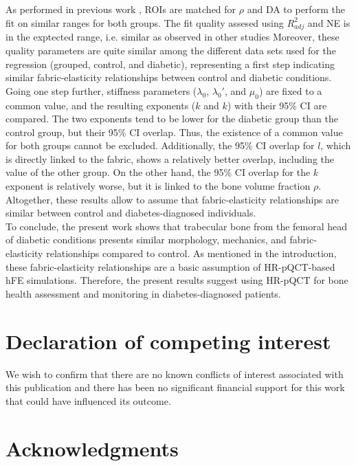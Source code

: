 \documentclass[a4paper,fleqn]{DC_ArtStyle}
\begin{document}
	As performed in previous work \cite{Simon2022}, ROIs are matched for $\rho$ and DA to perform the fit on similar ranges for both groups.
	The fit quality assesed using $R_{adj}^{2}$ and NE is in the exptected range, i.e. similar as observed in other studies \cite{Gross2012, Panyasantisuk2015, Simon2022}
	Moreover, these quality parameters are quite similar among the different data sets used for the regression (grouped, control, and diabetic), representing a first step indicating similar fabric-elasticity relationships between control and diabetic conditions.
	Going one step further, stiffness parameters ($\lambda_0$, $\lambda_0'$, and $\mu_0$) are fixed to a common value, and the resulting exponents ($k$ and $k$) with their 95\% CI are compared.
	The two exponents tend to be lower for the diabetic group than the control group, but their 95\% CI overlap. Thus, the existence of a common value for both groups cannot be excluded.
	Additionally, the 95\% CI overlap for $l$, which is directly linked to the fabric, shows a relatively better overlap, including the value of the other group.
	On the other hand, the 95\% CI overlap for the $k$ exponent is relatively worse, but it is linked to the bone volume fraction $\rho$.
	Altogether, these results allow to assume that fabric-elasticity relationships are similar between control and diabetes-diagnosed individuals.
	\\[0.5em]
	To conclude, the present work shows that trabecular bone from the femoral head of diabetic conditions presents similar morphology, mechanics, and fabric-elasticity relationships compared to control.
	As mentioned in the introduction, these fabric-elasticity relationships are a basic assumption of HR-pQCT-based hFE simulations.
	Therefore, the present results suggest using HR-pQCT for bone health assessment and monitoring in diabetes-diagnosed patients.

	
	\section*{Declaration of competing interest}
	We wish to confirm that there are no known conflicts of interest associated with this publication and there has been no significant financial support for this work that could have influenced its outcome.

	\section*{Acknowledgments}
	
\end{document}
